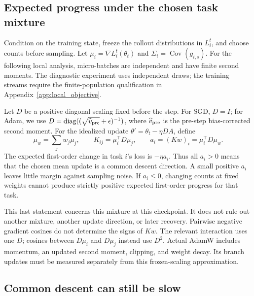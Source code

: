 \subsection{Expected progress under the chosen task mixture}

Condition on the training state, freeze the rollout distributions in
$L_i^t$, and choose counts before sampling. Let
$\mu_i=\nabla L_i^t(\theta_t)$ and
$\Sigma_i=\operatorname{Cov}(g_{i,s})$. For the following local analysis,
micro-batches are independent and have finite second moments. The
diagnostic experiment uses independent draws; the training streams require
the finite-population qualification in Appendix~\ref{app:local_objective}.

Let $D$ be a positive diagonal scaling fixed before the step. For SGD,
$D=I$; for Adam, we use
$D=\operatorname{diag}((\sqrt{\widehat v_{\rm pre}}+\epsilon)^{-1})$,
where $\widehat v_{\rm pre}$ is the pre-step bias-corrected second moment.
For the idealized update $\theta'=\theta_t-\eta DA$, define
\begin{equation}
    \mu_w=\sum_jw_j\mu_j,\qquad
    K_{ij}=\mu_i^\top D\mu_j,\qquad
    a_i=(Kw)_i=\mu_i^\top D\mu_w.
    \label{eq:transfer_margins}
\end{equation}
The expected first-order change in task $i$'s loss is $-\eta a_i$.
Thus all $a_i>0$ means that the chosen mean update is a common descent
direction. A small positive $a_i$ leaves little margin against sampling
noise. If $a_i\leq0$, changing counts at fixed weights cannot produce
strictly positive expected first-order progress for that task.

This last statement concerns this mixture at this checkpoint. It does
not rule out another mixture, another update direction, or later recovery.
Pairwise negative gradient cosines do not determine the signs of $Kw$.
The relevant interaction uses one $D$; cosines between $D\mu_i$ and
$D\mu_j$ instead use $D^2$. Actual AdamW includes momentum, an updated
second moment, clipping, and weight decay. Its branch updates must be
measured separately from this frozen-scaling approximation.

\subsection{Common descent can still be slow}
\label{sec:local_rates}

